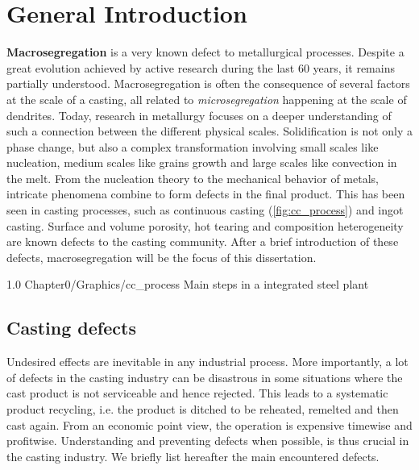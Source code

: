 \chapter{General Introduction}
\textbf{Macrosegregation} is a very known defect to metallurgical processes. Despite a great evolution achieved by active research during the last 60 years,
it remains partially understood. Macrosegregation is often  the consequence of several factors at the scale of a casting, all related to \emph{microsegregation} happening at the scale
of dendrites. Today, research in metallurgy focuses on a deeper understanding of such a connection between the different physical scales.
Solidification is not only a phase change, but also a complex transformation involving small scales like nucleation, medium scales
like grains growth and large scales like convection in the melt. From the nucleation theory to the mechanical behavior of metals, intricate phenomena combine to form defects in the final product. This has been seen in casting processes, such as continuous casting (\cref{fig:cc_process}) and ingot casting. Surface and volume porosity, hot tearing and composition heterogeneity are known defects to the casting community. After a brief introduction of these defects, macrosegregation will be the focus of this dissertation. 

\begin{figureth}
{1.0}
{Chapter0/Graphics/cc_process}
{Main steps in a integrated steel plant}
\label{fig:cc_process}
\end{figureth}
%
%
\section{Casting defects}
%
Undesired effects are inevitable in any industrial process. More importantly, 
a lot of defects in the casting industry can be disastrous in some situations 
where the cast product is not serviceable and hence rejected. This leads to a 
systematic product recycling, i.e. the product is ditched to be reheated, remelted 
and then cast again. From an economic point view, the operation is expensive timewise 
and profitwise. Understanding and preventing defects when possible, is thus crucial in 
the casting industry. We briefly list hereafter the main encountered defects.
%
%
